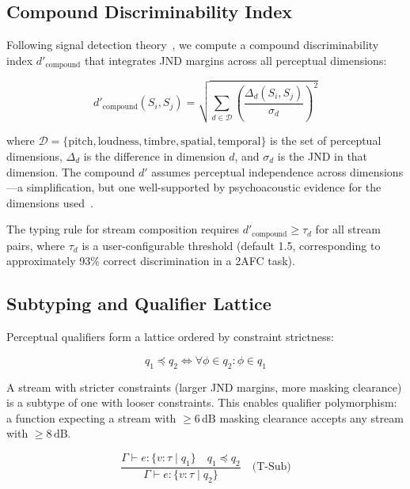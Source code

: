 \documentclass[sigchi, nonacm]{acmart}
\begin{document}
\subsection{Compound Discriminability Index}
\label{sec:compound_dprime}

Following signal detection theory~\cite{green1966signal}, we compute a compound discriminability index $d'_\mathrm{compound}$ that integrates JND margins across all perceptual dimensions:

\begin{equation}
d'_\mathrm{compound}(S_i, S_j) = \sqrt{\sum_{d \in \mathcal{D}} \left( \frac{\Delta_d(S_i, S_j)}{\sigma_d} \right)^2}
\end{equation}

where $\mathcal{D} = \{\text{pitch}, \text{loudness}, \text{timbre}, \text{spatial}, \text{temporal}\}$ is the set of perceptual dimensions, $\Delta_d$ is the difference in dimension $d$, and $\sigma_d$ is the JND in that dimension. The compound $d'$ assumes perceptual independence across dimensions---a simplification, but one well-supported by psychoacoustic evidence for the dimensions used~\cite{moore2012introduction}.

The typing rule for stream composition requires $d'_\mathrm{compound} \geq \tau_d$ for all stream pairs, where $\tau_d$ is a user-configurable threshold (default 1.5, corresponding to approximately 93\% correct discrimination in a 2AFC task).

\subsection{Subtyping and Qualifier Lattice}

Perceptual qualifiers form a lattice ordered by constraint strictness:

\begin{equation}
q_1 \preceq q_2 \iff \forall \phi \in q_2: \phi \in q_1
\end{equation}

A stream with stricter constraints (larger JND margins, more masking clearance) is a subtype of one with looser constraints. This enables qualifier polymorphism: a function expecting a stream with $\geq 6\,\mathrm{dB}$ masking clearance accepts any stream with $\geq 8\,\mathrm{dB}$.

\begin{equation}
\frac{\Gamma \vdash e : \{v : \tau \mid q_1\} \quad q_1 \preceq q_2}{\Gamma \vdash e : \{v : \tau \mid q_2\}} \quad \text{(T-Sub)}
\end{equation}
\end{document}
